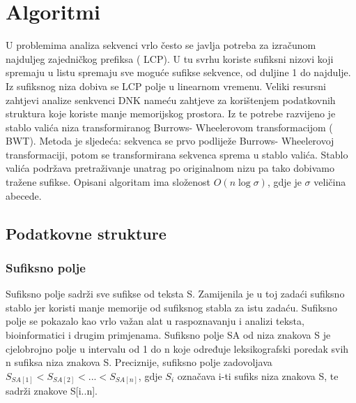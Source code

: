 \documentclass[11pt]{article}
\begin{document}
\section{Algoritmi}
U problemima analiza sekvenci vrlo često se javlja potreba za izračunom najduljeg zajedničkog prefiksa ( LCP). U tu svrhu koriste sufiksni nizovi koji spremaju u listu spremaju sve moguće sufikse sekvence, od duljine 1 do najdulje. Iz sufiksnog niza dobiva se LCP polje u linearnom vremenu. 
Veliki resursni zahtjevi analize senkvenci DNK nameću zahtjeve za korištenjem podatkovnih struktura koje koriste manje memorijskog prostora. Iz te potrebe razvijeno je stablo valića niza transformiranog Burrows- Wheelerovom transformacijom ( BWT).
Metoda je sljedeća: sekvenca se prvo podliježe Burrows- Wheelerovoj transformaciji, potom se transformirana sekvenca sprema u stablo valića. Stablo valića podržava pretraživanje unatrag po originalnom nizu pa tako dobivamo tražene sufikse. Opisani algoritam ima složenost $O(n\log\sigma)$, gdje je $\sigma$ veličina abecede.

\subsection{Podatkovne strukture}

\subsubsection{Sufiksno polje}
Sufiksno polje sadrži sve sufikse od teksta S. Zamijenila je u toj zadaći sufiksno stablo jer koristi manje memorije od sufiksnog stabla za istu zadaću. Sufiksno polje se pokazalo kao vrlo važan alat u raspoznavanju i analizi teksta, bioinformatici i drugim primjenama. 
Sufiksno polje SA od niza znakova S je cjelobrojno polje u intervalu od 1 do n koje određuje leksikografski poredak svih n sufiksa niza znakova S. Preciznije, sufiksno polje zadovoljava $ S_{SA[1]} < S_{SA[2]} < ... < S_{SA[n]}$, gdje $ S_i $ označava i-ti sufiks niza znakova S, te sadrži znakove S[i..n].
 
\end{document}
